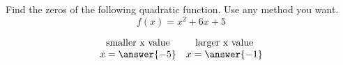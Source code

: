 \documentclass{ximera}
\author{David Kish}
\begin{document}
\begin{exercise}
Find the zeros of the following quadratic function. Use any method you want. 
\[
f(x) = x^2+6x + 5
\]

\[
\begin{array}{cc}
\text{smaller x value} & \text{larger x value}\\
x  = \answer{-5} & x = \answer{-1}
\end{array}
\]
\end{exercise}
\end{document}
